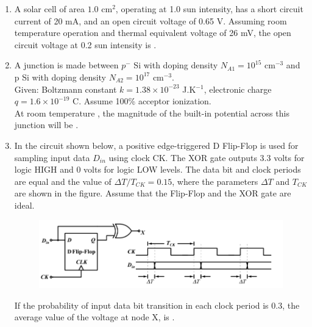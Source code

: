 \documentclass[a4paper, 11pt]{article}
\begin{document}
\begin{enumerate}
    \hfill{}

    \item A solar cell of area $1.0$ cm$^2$, operating at 1.0 sun intensity, has a short circuit current of 20 mA, and an open circuit voltage of 0.65 V. Assuming room temperature operation and thermal equivalent voltage of 26 mV, the open circuit voltage  at 0.2 sun intensity is \underline{\hspace{2cm}}.

    \hfill{}

    \item A junction is made between $p^-$ Si with doping density $N_{A1} = 10^{15}$ cm$^{-3}$ and p Si with doping density $N_{A2} = 10^{17}$ cm$^{-3}$.\\Given: Boltzmann constant $k=1.38 \times 10^{-23}$ J.K$^{-1}$, electronic charge $q = 1.6 \times 10^{-19}$ C. Assume 100\% acceptor ionization.\\At room temperature , the magnitude of the built-in potential  across this junction will be \underline{\hspace{2cm}}.
    
    \hfill{}

    \item In the circuit shown below, a positive edge-triggered D Flip-Flop is used for sampling input data $D_{in}$ using clock CK. The XOR gate outputs 3.3 volts for logic HIGH and 0 volts for logic LOW levels. The data bit and clock periods are equal and the value of $\Delta T/T_{CK} = 0.15$, where the parameters $\Delta T$ and $T_{CK}$ are shown in the figure. Assume that the Flip-Flop and the XOR gate are ideal.
    \begin{figure}[H]
        \centering
        \includegraphics[width=0.8\columnwidth]{figs/q46.png}
        \caption*{}
        \label{fig:q46}
    \end{figure}
    If the probability of input data bit  transition in each clock period is 0.3, the average value  of the voltage at node X, is \underline{\hspace{2cm}}.
    

\end{enumerate}
\end{document}
